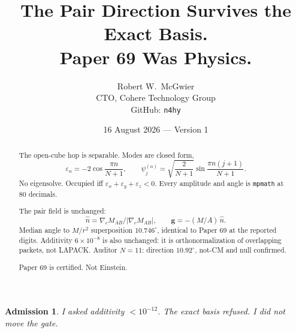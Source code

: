 \documentclass[11pt]{article}
\title{\textbf{The Pair Direction Survives the Exact Basis.\\
Paper 69 Was Physics.}}
\author{Robert W.\ McGwier\\
\small CTO, Cohere Technology Group\\
\small GitHub: \texttt{n4hy}}
\date{16 August 2026 --- Version 1}
\newtheorem*{admission}{Admission}
\begin{document}
\maketitle

\begin{abstract}
\noindent
The open-cube hop is separable. Modes are closed form,
\[
\varepsilon_n=-2\cos\frac{\pi n}{N+1},\qquad
\psi_j^{(n)}=\sqrt{\frac{2}{N+1}}\sin\frac{\pi n(j+1)}{N+1}.
\]
No eigensolve. Occupied iff $\varepsilon_x+\varepsilon_y+\varepsilon_z<0$.
Every amplitude and angle is \texttt{mpmath} at $80$ decimals.

The pair field is unchanged:
\[
\hat n=\nabla_c M_{AB}/\lvert\nabla_c M_{AB}\rvert,\qquad
\mathbf g=-(M/A)\,\hat n.
\]
Median angle to $M/r^2$ superposition $10.746^\circ$,
identical to Paper 69 at the reported digits.
Additivity $6\times 10^{-8}$ is also unchanged: it is
orthonormalization of overlapping packets, not LAPACK.
Auditor $N=11$: direction $10.92^\circ$, not-CM and
null confirmed.

Paper 69 is certified. Not Einstein.
\end{abstract}

\begin{admission}
I asked additivity $<10^{-12}$. The exact basis
refused. I did not move the gate.
\end{admission}
\end{document}
